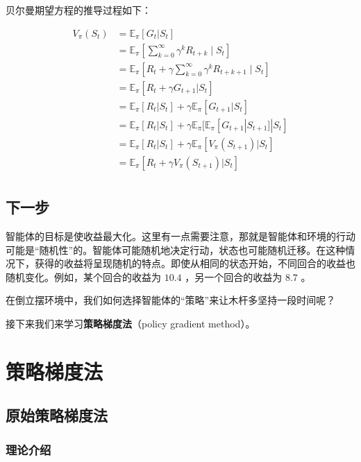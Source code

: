\documentclass[lang=cn,newtx,10pt,scheme=chinese]{elegantbook}
\begin{document}
贝尔曼期望方程的推导过程如下：

\begin{equation}
\begin{aligned}
V_\pi(S_t) &= \mathbb{E}_\pi[G_t|S_t] \\
&= \mathbb{E}_\pi\left[\sum_{k=0}^\infty\gamma^kR_{t+k}\mid S_t\right] \\
&= \mathbb{E}_\pi\left[R_t+\gamma\sum_{k=0}^\infty\gamma^kR_{t+k+1}\mid S_t\right] \\
&= \mathbb{E}_\pi[R_t+\gamma G_{t+1}|S_t] \\
&= \mathbb{E}_\pi[R_t|S_t]+\gamma \mathbb{E}_\pi[G_{t+1}|S_t] \\
&= \mathbb{E}_\pi[R_t|S_t]+\gamma \mathbb{E}_\pi[\mathbb{E}_\pi [G_{t+1}|S_{t+1}]|S_t] \\
&= \mathbb{E}_\pi[R_t|S_t]+\gamma \mathbb{E}_\pi[V_\pi(S_{t+1})|S_t] \\
&= \mathbb{E}_\pi[R_t+\gamma V_\pi(S_{t+1})|S_t] \\
\end{aligned}
\end{equation}

\section{下一步}

智能体的目标是使收益最大化。这里有一点需要注意，那就是智能体和环境的行动可能是``随机性''的。智能体可能随机地决定行动，状态也可能随机迁移。在这种情况下，获得的收益将呈现随机的特点。即使从相同的状态开始，不同回合的收益也随机变化。例如，某个回合的收益为 $10.4$ ，另一个回合的收益为 $8.7$ 。

在倒立摆环境中，我们如何选择智能体的``策略''来让木杆多坚持一段时间呢？

接下来我们来学习\textbf{策略梯度法}（policy gradient method）。


\chapter{策略梯度法}

\section{原始策略梯度法}

\subsection{理论介绍}
\end{document}
